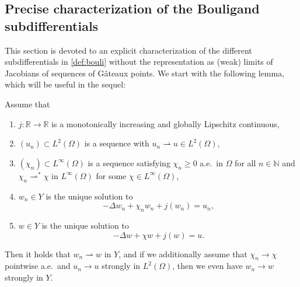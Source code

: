 \documentclass[reqno]{shinyart}
\begin{document}
\subsection{Precise characterization of the Bouligand subdifferentials}

This section is devoted to an explicit characterization of the different 
subdifferentials in \cref{def:bouli} without the representation 
as (weak) limits of Jacobians of sequences 
of G\^ateaux points. We start with the following lemma, which will be useful 
in the sequel:

\begin{lemma}\label{le:PDElemma}
    Assume that
    \begin{enumerate}[label=(\roman*)]
        \item $j : {\mathbb{R}} \to {\mathbb{R}}$ is a  monotonically increasing and globally Lipschitz continuous,
        \item $(u_n) \subset L^2(\Omega)$ is a sequence with $u_n \rightharpoonup u \in L^2(\Omega)$,
        \item $(\chi_n) \subset L^\infty(\Omega)$ is a sequence satisfying  
            $\chi_n \geq 0$ a.e.\ in $\Omega$ for all  $n\in{\mathbb{N}}$ and 
            $\chi_n {\rightharpoonup}^{*} \chi $ in $L^\infty(\Omega)$ for some $\chi\in L^\infty(\Omega)$,
        \item $w_n \in Y$ is the unique solution to 
            \begin{equation}\label{eq:pdewn}
                -\Delta w_n + \chi_n w_n + j(w_n) = u_n,
            \end{equation}
        \item $w \in Y$ is the unique solution to 
            \begin{equation}\label{eq:pdew}
                -\Delta w + \chi  w  + j(w)= u.
            \end{equation}
    \end{enumerate}
    Then it holds that $w_n \rightharpoonup w$ in $Y$, and if we additionally assume that 
    $\chi_n \to  \chi$ pointwise a.e.\ and $u_n \to u$ strongly in $L^2(\Omega)$, 
    then we even have $w_n \to w$ strongly in $Y$.
\end{lemma}
\end{document}
